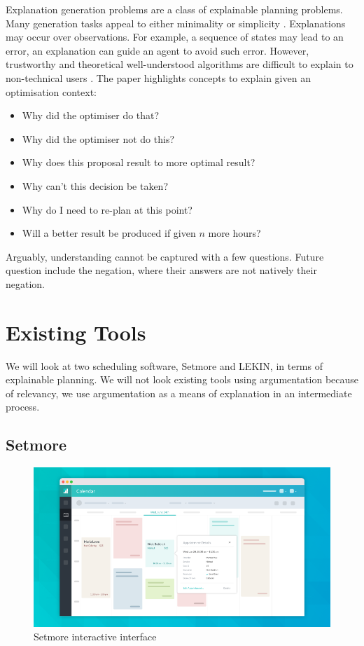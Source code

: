 Explanation generation problems are a class of explainable planning problems. Many generation tasks appeal to either minimality or simplicity \cite{pe}. Explanations may occur over observations. For example, a sequence of states may lead to an error, an explanation can guide an agent to avoid such error. However, trustworthy and theoretical well-understood algorithms are difficult to explain to non-technical users \cite{ep}. The paper highlights concepts to explain given an optimisation context:
\begin{itemize}
	\item Why did the optimiser do that?
	\item Why did the optimiser not do this?
	\item Why does this proposal result to more optimal result?
	\item Why can't this decision be taken?
	\item Why do I need to re-plan at this point?
	\item Will a better result be produced if given $n$ more hours?
\end{itemize}

Arguably, understanding cannot be captured with a few questions. Future question include the negation, where their answers are not natively their negation.

\section{Existing Tools}

We will look at two scheduling software, Setmore and LEKIN, in terms of explainable planning. We will not look existing tools using argumentation because of relevancy, we use argumentation as a means of explanation in an intermediate process.

\subsection{Setmore}

\begin{figure}[H]
	\begin{center}
		\includegraphics[scale=0.4]{figures/setmore.png}
	\end{center}
	\caption{Setmore interactive interface \cite{setmore}}
\end{figure}


